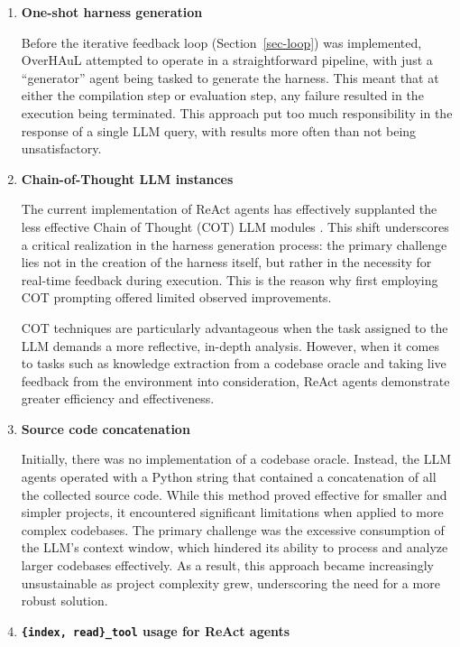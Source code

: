 \documentclass[
  a4paper,
  DIV=11,
  numbers=noendperiod]{scrreprt}
\theoremstyle{definition}
\theoremstyle{remark}
\begin{document}
\begin{enumerate}
\def\labelenumi{\arabic{enumi}.}
\item
  \textbf{One-shot harness generation}

  Before the iterative feedback loop (Section~\ref{sec-loop}) was
  implemented, OverHAuL attempted to operate in a straightforward
  pipeline, with just a ``generator'' agent being tasked to generate the
  harness. This meant that at either the compilation step or evaluation
  step, any failure resulted in the execution being terminated. This
  approach put too much responsibility in the response of a single LLM
  query, with results more often than not being unsatisfactory.
\item
  \textbf{Chain-of-Thought LLM instances}

  The current implementation of ReAct agents has effectively supplanted
  the less effective Chain of Thought (COT) LLM modules
  \autocite{chainofthought}. This shift underscores a critical
  realization in the harness generation process: the primary challenge
  lies not in the creation of the harness itself, but rather in the
  necessity for real-time feedback during execution. This is the reason
  why first employing COT prompting offered limited observed
  improvements.

  COT techniques are particularly advantageous when the task assigned to
  the LLM demands a more reflective, in-depth analysis. However, when it
  comes to tasks such as knowledge extraction from a codebase oracle and
  taking live feedback from the environment into consideration, ReAct
  agents demonstrate greater efficiency and effectiveness.
\item
  \textbf{Source code concatenation}

  Initially, there was no implementation of a codebase oracle. Instead,
  the LLM agents operated with a Python string that contained a
  concatenation of all the collected source code. While this method
  proved effective for smaller and simpler projects, it encountered
  significant limitations when applied to more complex codebases. The
  primary challenge was the excessive consumption of the LLM's context
  window, which hindered its ability to process and analyze larger
  codebases effectively. As a result, this approach became increasingly
  unsustainable as project complexity grew, underscoring the need for a
  more robust solution.
\item
  \textbf{\texttt{\{index,\ read\}\_tool} usage for ReAct agents}


\end{enumerate}
\end{document}

